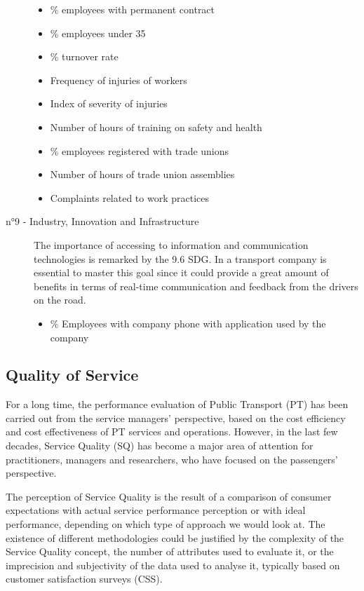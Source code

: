 \begin{description}
   \begin{itemize}
       \item \% employees with permanent contract
       \item \% employees under 35 
       \item \% turnover rate
       \item Frequency of injuries of workers
       \item Index of severity of injuries
       \item Number of hours of training on safety and health
       \item \% employees registered with trade unions
       \item Number of hours of trade union assemblies
       \item Complaints related to work practices
   \end{itemize}
   \item [n°9 - Industry, Innovation and Infrastructure ] The importance of accessing to information and communication technologies is remarked by the 9.6 SDG. In a transport company is essential to master this goal since it could provide a great amount of benefits in terms of real-time communication and feedback from the drivers on the road.
   \begin{itemize}
       \item \% Employees with company phone with application used by the company
   \end{itemize}
\end{description}

\subsection{Quality of Service}
For a long time, the performance evaluation of Public Transport (PT) has been carried out from the service managers’ perspective, based on the cost efficiency and cost effectiveness of PT services and operations. However, in the last few decades, Service Quality (SQ) has become a major area of attention for practitioners, managers and researchers, who have focused on the passengers' perspective.

The perception of Service Quality is the result of a comparison of consumer expectations with actual service performance perception or with ideal performance, depending on which type of approach we would look at. The existence of different methodologies could be justified by the complexity of the Service Quality concept, the number of attributes used to evaluate it, or the imprecision and subjectivity of the data used to analyse it, typically based on customer satisfaction surveys (CSS). 


